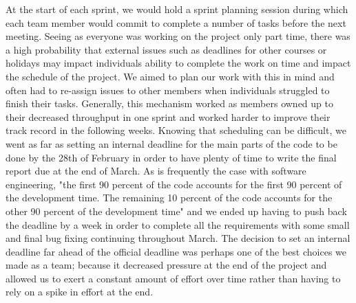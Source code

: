 \documentclass[a4paper]{report}
\begin{document}
	\par At the start of each sprint, we would hold a sprint planning session during which each team member would commit to complete a number of tasks before the next meeting. Seeing as everyone was working on the project only part time, there was a high probability that external issues such as deadlines for other courses or holidays may impact individuals ability to complete the work on time and impact the schedule of the project. We aimed to plan our work with this in mind and often had to re-assign issues to other members when individuals struggled to finish their tasks. Generally, this mechanism worked as members owned up to their decreased throughput in one sprint and worked harder to improve their track record in the following weeks. Knowing that scheduling can be difficult, we went as far as setting an internal deadline for the main parts of the code to be done by the 28th of February in order to have plenty of time to write the final report due at the end of March. As is frequently the case with software engineering, "the first 90 percent of the code accounts for the first 90 percent of the development time. The remaining 10 percent of the code accounts for the other 90 percent of the development time" \cite{bentley_programmimg_1985} and we ended up having to push back the deadline by a week in order to complete all the requirements with some small and final bug fixing continuing throughout March. The decision to set an internal deadline far ahead of the official deadline was perhaps one of the best choices we made as a team; because it decreased pressure at the end of the project and allowed us to exert a constant amount of effort over time rather than having to rely on a spike in effort at the end.\newline
	
\end{document}
